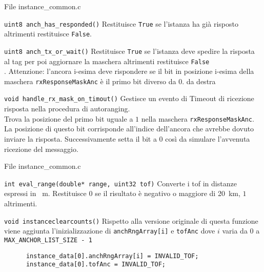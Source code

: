 \begin{frame}[shrink = 10]{File instance\_common.c}%
  \begin{block}{\lstinline!uint8 anch_has_responded()!}
    Restituisce \lstinline!True! se l'istanza ha già risposto altrimenti restituisce \lstinline!False!.
  \end{block}
  \begin{block}{\lstinline!uint8 anch_tx_or_wait()!}
    Restituisce \lstinline!True! se l'istanza deve spedire la risposta al tag per poi aggiornare la maschera altrimenti restituisce \lstinline!False!\\.
    \textcolor{dgreen}{Attenzione:} l'ancora i-esima deve rispondere se il bit in posizione i-esima della maschera \lstinline!rxResponseMaskAnc! è il primo bit diverso da $0$.
    da destra
  \end{block}
  \begin{block}{\lstinline!void handle_rx_mask_on_timout()!}
    Gestisce un evento di Timeout di ricezione risposta nella procedura di autoranging.\\
    Trova la posizione del primo bit uguale a $1$ nella maschera \lstinline!rxResponseMaskAnc!. La posizione di questo bit corrisponde all'indice dell'ancora che avrebbe
    dovuto inviare la risposta. Successivamente setta il bit a $0$ così da simulare l'avvenuta ricezione del messaggio.
  \end{block}
\end{frame}

\begin{frame}[fragile]{File instance\_common.c}
  \begin{block}{\lstinline!int eval_range(double* range, uint32 tof)!}
    Converte i tof in distanze espressi in \SI{}{\meter}. Restituisce $0$ se il risultato è negativo o maggiore di \SI{20}{\kilo\meter}, 
    $1$ altrimenti.
  \end{block}
  \begin{block}{\lstinline!void instanceclearcounts()!}
    Rispetto alla versione originale di questa funzione viene aggiunta l'inizializzazione di \lstinline!anchRngArray[i]! e \lstinline!tofAnc!
    dove $i$ varia da $0$ a \lstinline!MAX_ANCHOR_LIST_SIZE - 1!
    \begin{lstlisting}
      instance_data[0].anchRngArray[i] = INVALID_TOF;
      instance_data[0].tofAnc = INVALID_TOF;
    \end{lstlisting}
  \end{block}
\end{frame}

